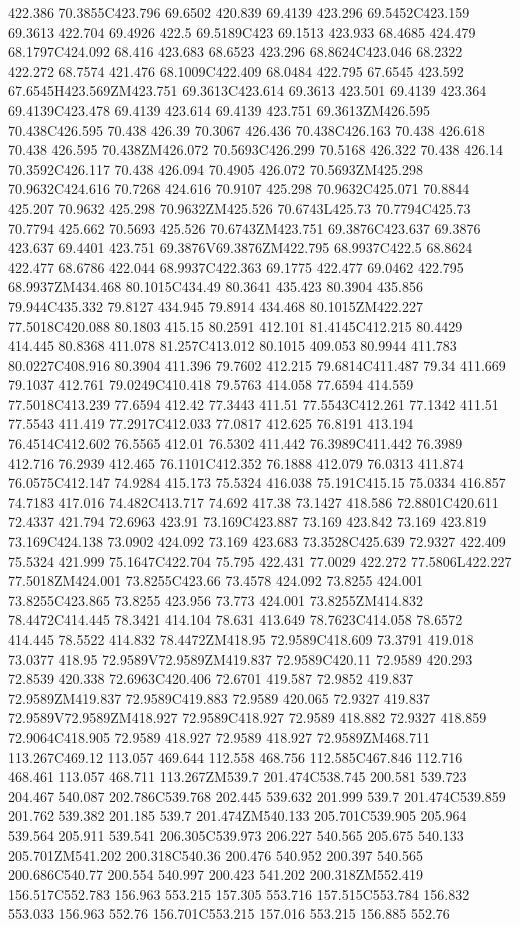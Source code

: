 422.386 70.3855C423.796 69.6502 420.839 69.4139 423.296 69.5452C423.159 69.3613 422.704 69.4926 422.5 69.5189C423 69.1513 423.933 68.4685 424.479 68.1797C424.092 68.416 423.683 68.6523 423.296 68.8624C423.046 68.2322 422.272 68.7574 421.476 68.1009C422.409 68.0484 422.795 67.6545 423.592 67.6545H423.569ZM423.751 69.3613C423.614 69.3613 423.501 69.4139 423.364 69.4139C423.478 69.4139 423.614 69.4139 423.751 69.3613ZM426.595 70.438C426.595 70.438 426.39 70.3067 426.436 70.438C426.163 70.438 426.618 70.438 426.595 70.438ZM426.072 70.5693C426.299 70.5168 426.322 70.438 426.14 70.3592C426.117 70.438 426.094 70.4905 426.072 70.5693ZM425.298 70.9632C424.616 70.7268 424.616 70.9107 425.298 70.9632C425.071 70.8844 425.207 70.9632 425.298 70.9632ZM425.526 70.6743L425.73 70.7794C425.73 70.7794 425.662 70.5693 425.526 70.6743ZM423.751 69.3876C423.637 69.3876 423.637 69.4401 423.751 69.3876V69.3876ZM422.795 68.9937C422.5 68.8624 422.477 68.6786 422.044 68.9937C422.363 69.1775 422.477 69.0462 422.795 68.9937ZM434.468 80.1015C434.49 80.3641 435.423 80.3904 435.856 79.944C435.332 79.8127 434.945 79.8914 434.468 80.1015ZM422.227 77.5018C420.088 80.1803 415.15 80.2591 412.101 81.4145C412.215 80.4429 414.445 80.8368 411.078 81.257C413.012 80.1015 409.053 80.9944 411.783 80.0227C408.916 80.3904 411.396 79.7602 412.215 79.6814C411.487 79.34 411.669 79.1037 412.761 79.0249C410.418 79.5763 414.058 77.6594 414.559 77.5018C413.239 77.6594 412.42 77.3443 411.51 77.5543C412.261 77.1342 411.51 77.5543 411.419 77.2917C412.033 77.0817 412.625 76.8191 413.194 76.4514C412.602 76.5565 412.01 76.5302 411.442 76.3989C411.442 76.3989 412.716 76.2939 412.465 76.1101C412.352 76.1888 412.079 76.0313 411.874 76.0575C412.147 74.9284 415.173 75.5324 416.038 75.191C415.15 75.0334 416.857 74.7183 417.016 74.482C413.717 74.692 417.38 73.1427 418.586 72.8801C420.611 72.4337 421.794 72.6963 423.91 73.169C423.887 73.169 423.842 73.169 423.819 73.169C424.138 73.0902 424.092 73.169 423.683 73.3528C425.639 72.9327 422.409 75.5324 421.999 75.1647C422.704 75.795 422.431 77.0029 422.272 77.5806L422.227 77.5018ZM424.001 73.8255C423.66 73.4578 424.092 73.8255 424.001 73.8255C423.865 73.8255 423.956 73.773 424.001 73.8255ZM414.832 78.4472C414.445 78.3421 414.104 78.631 413.649 78.7623C414.058 78.6572 414.445 78.5522 414.832 78.4472ZM418.95 72.9589C418.609 73.3791 419.018 73.0377 418.95 72.9589V72.9589ZM419.837 72.9589C420.11 72.9589 420.293 72.8539 420.338 72.6963C420.406 72.6701 419.587 72.9852 419.837 72.9589ZM419.837 72.9589C419.883 72.9589 420.065 72.9327 419.837 72.9589V72.9589ZM418.927 72.9589C418.927 72.9589 418.882 72.9327 418.859 72.9064C418.905 72.9589 418.927 72.9589 418.927 72.9589ZM468.711 113.267C469.12 113.057 469.644 112.558 468.756 112.585C467.846 112.716 468.461 113.057 468.711 113.267ZM539.7 201.474C538.745 200.581 539.723 204.467 540.087 202.786C539.768 202.445 539.632 201.999 539.7 201.474C539.859 201.762 539.382 201.185 539.7 201.474ZM540.133 205.701C539.905 205.964 539.564 205.911 539.541 206.305C539.973 206.227 540.565 205.675 540.133 205.701ZM541.202 200.318C540.36 200.476 540.952 200.397 540.565 200.686C540.77 200.554 540.997 200.423 541.202 200.318ZM552.419 156.517C552.783 156.963 553.215 157.305 553.716 157.515C553.784 156.832 553.033 156.963 552.76 156.701C553.215 157.016 553.215 156.885 552.76 